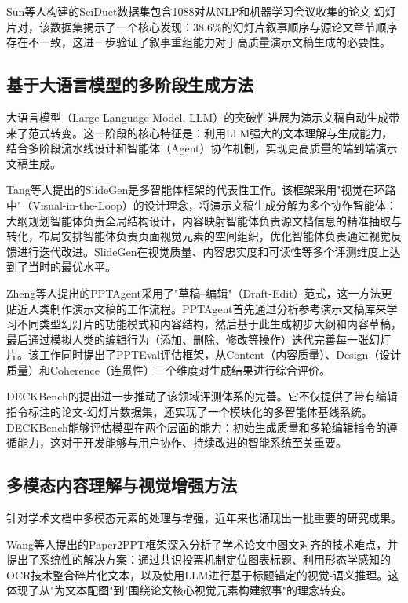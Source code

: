Sun等人\cite{sun2021d2s}构建的SciDuet数据集包含1088对从NLP和机器学习会议收集的论文-幻灯片对，该数据集揭示了一个核心发现：38.6\%的幻灯片叙事顺序与源论文章节顺序存在不一致，这进一步验证了叙事重组能力对于高质量演示文稿生成的必要性。

\subsection{基于大语言模型的多阶段生成方法}

大语言模型（Large Language Model, LLM）的突破性进展为演示文稿自动生成带来了范式转变。这一阶段的核心特征是：利用LLM强大的文本理解与生成能力，结合多阶段流水线设计和智能体（Agent）协作机制，实现更高质量的端到端演示文稿生成。

Tang等人提出的SlideGen\cite{tang2024slidegen}是多智能体框架的代表性工作。该框架采用"视觉在环路中"（Visual-in-the-Loop）的设计理念，将演示文稿生成分解为多个协作智能体：大纲规划智能体负责全局结构设计，内容映射智能体负责源文档信息的精准抽取与转化，布局安排智能体负责页面视觉元素的空间组织，优化智能体负责通过视觉反馈进行迭代改进。SlideGen在视觉质量、内容忠实度和可读性等多个评测维度上达到了当时的最优水平。

Zheng等人提出的PPTAgent\cite{zheng2025pptagent}采用了"草稿--编辑"（Draft-Edit）范式，这一方法更贴近人类制作演示文稿的工作流程。PPTAgent首先通过分析参考演示文稿库来学习不同类型幻灯片的功能模式和内容结构，然后基于此生成初步大纲和内容草稿，最后通过模拟人类的编辑行为（添加、删除、修改等操作）迭代完善每一张幻灯片。该工作同时提出了PPTEval评估框架，从Content（内容质量）、Design（设计质量）和Coherence（连贯性）三个维度对生成结果进行综合评价。

DECKBench\cite{ge2025deckbench}的提出进一步推动了该领域评测体系的完善。它不仅提供了带有编辑指令标注的论文-幻灯片数据集，还实现了一个模块化的多智能体基线系统。DECKBench能够评估模型在两个层面的能力：初始生成质量和多轮编辑指令的遵循能力，这对于开发能够与用户协作、持续改进的智能系统至关重要。

\subsection{多模态内容理解与视觉增强方法}

针对学术文档中多模态元素的处理与增强，近年来也涌现出一批重要的研究成果。

Wang等人提出的Paper2PPT\cite{wang2024paper2ppt}框架深入分析了学术论文中图文对齐的技术难点，并提出了系统性的解决方案：通过共识投票机制定位图表标题、利用形态学感知的OCR技术整合碎片化文本，以及使用LLM进行基于标题锚定的视觉-语义推理。这体现了从"为文本配图"到"围绕论文核心视觉元素构建叙事"的理念转变。

